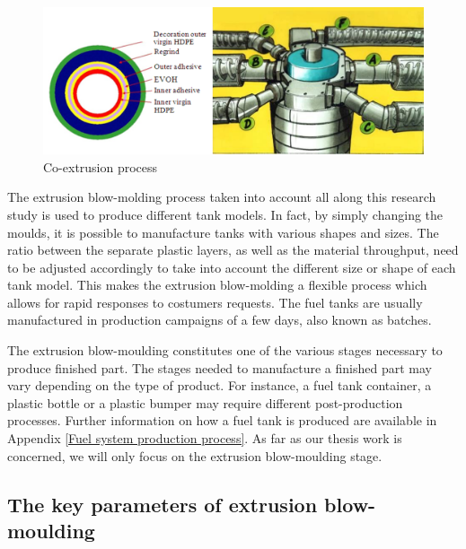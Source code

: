 \begin{figure}
\centerline{\includegraphics[scale=0.55]{images/chapter_1/coextrusion.png}}
\caption{Co-extrusion process}
\label{fig:Co-extrusion Process}
\end{figure}

The extrusion blow-molding process taken into account all along this research study is used to produce different tank models. In fact, by simply changing the moulds, it is possible to manufacture tanks with various shapes and sizes. The ratio between the separate plastic layers, as well as the material throughput, need to be adjusted accordingly to take into account the different size or shape of each tank model. This makes the extrusion blow-molding a flexible process which allows for rapid responses to costumers requests. The fuel tanks are usually manufactured in production campaigns of a few days, also known as batches.

The extrusion blow-moulding constitutes one of the various stages necessary to produce finished part. The stages needed to manufacture a finished part may vary depending on the type of product. For instance, a fuel tank container, a plastic bottle or a plastic bumper may require different post-production processes. Further information on how a fuel tank is produced are available in Appendix \ref{Fuel system production process}. As far as our thesis work is concerned, we will only focus on the extrusion blow-moulding stage.

\subsection{The key parameters of extrusion blow-moulding} \label{The key parameters of the Extrusion Blow-moulding}

